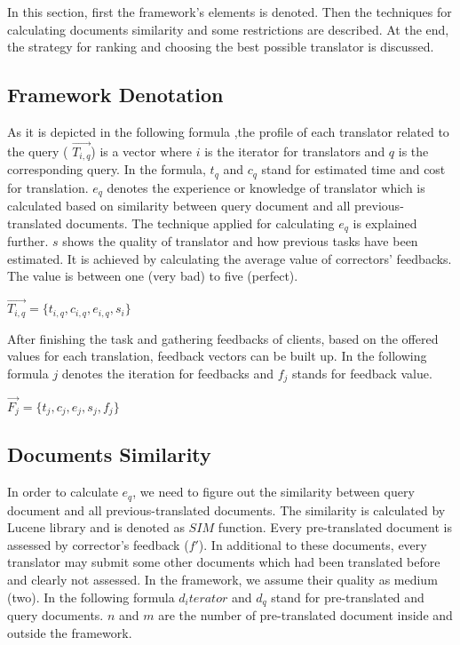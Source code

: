 In this section, first the framework's elements is denoted. Then the techniques for calculating documents similarity and some restrictions are described. At the end, the strategy for ranking and choosing the best possible translator is discussed.

\subsection{Framework Denotation}
As it is depicted in the following formula ,the profile of each translator related to the query (
$\overrightarrow{T_{i,q}}$) is a vector where $i$ is the iterator for translators and $q$ is the corresponding query. In the formula, $t_q$ and $c_q$ stand for estimated time and cost for translation. $e_q$ denotes the experience or knowledge of translator which is calculated based on similarity between query document and all previous-translated documents. The technique applied for calculating $e_q$ is explained further. $s$ shows the quality of translator and how previous tasks have been estimated. It is achieved by calculating the average value of correctors' feedbacks. The value is between one (very bad) to five (perfect).

\begin{center}
$\overrightarrow{T_{i,q}} = \{ t_{i,q}, c_{i,q}, e_{i,q}, s_i \}$ \\
\end{center}

After finishing the task and gathering feedbacks of clients, based on the offered values for each translation, feedback vectors can be built up. In the following formula $j$ denotes the iteration for feedbacks and $f_j$ stands for feedback value.

\begin{center}
$\overrightarrow{F_j} = \{ t_j, c_j, e_j, s_j, f_j \}$ \\
\end{center}

\subsection{Documents Similarity}
In order to calculate $e_q$, we need to figure out the similarity between query document and all previous-translated documents. The similarity is calculated by Lucene library and is denoted as $SIM$ function. Every pre-translated document is assessed by corrector's feedback ($f'$). In additional to these documents, every translator may submit some other documents which had been translated before and clearly not assessed. In the framework, we assume their quality as medium (two). In the following formula $d_iterator$ and $d_q$ stand for pre-translated and query documents. $n$ and $m$ are the number of pre-translated document inside and outside the framework.

